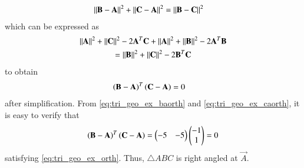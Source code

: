 \begin{enumerate}[label=\arabic*.,ref=\thesubsection.\theenumi]
\begin{align}
\left\lVert\mathbf{B}-\mathbf{A}\right\rVert^2+\left\lVert\mathbf{C}-\mathbf{A}\right\rVert^2&=\left\lVert\mathbf{B}-\mathbf{C}\right\rVert^2
\end{align}
which can be expressed as
\begin{multline}
\left\lVert\mathbf{A}\right\rVert^2 + \left\lVert\mathbf{C}\right\rVert^2 - 2\mathbf{A}^T\mathbf{C}+
\left\lVert\mathbf{A}\right\rVert^2 + \left\lVert\mathbf{B}\right\rVert^2 - 2\mathbf{A}^T\mathbf{B}
\\
=
\left\lVert\mathbf{B}\right\rVert^2 + \left\lVert\mathbf{C}\right\rVert^2 - 2\mathbf{B}^T\mathbf{C}
\end{multline}
%
to obtain 
\begin{align}
\label{eq:tri_geo_ex_orth}
\left(\mathbf{B}-\mathbf{A}\right)^T\left(\mathbf{C}-\mathbf{A}\right)&=0
\end{align}
%
after simplification.  From \eqref{eq:tri_geo_ex_baorth} and \eqref{eq:tri_geo_ex_caorth}, it is easy to verify that 
\begin{align}
\label{eq:tri_geo_ex_orth_sol}
\left(\mathbf{B}-\mathbf{A}\right)^T\left(\mathbf{C}-\mathbf{A}\right)=
 \begin{pmatrix}-5 & -5\end{pmatrix}\begin{pmatrix}-1\\1\end{pmatrix} = 0
\end{align}
satisfying
\eqref{eq:tri_geo_ex_orth}. Thus,  $\triangle ABC$ is right angled at $\vec{A}$.
%
%


\end{enumerate}
